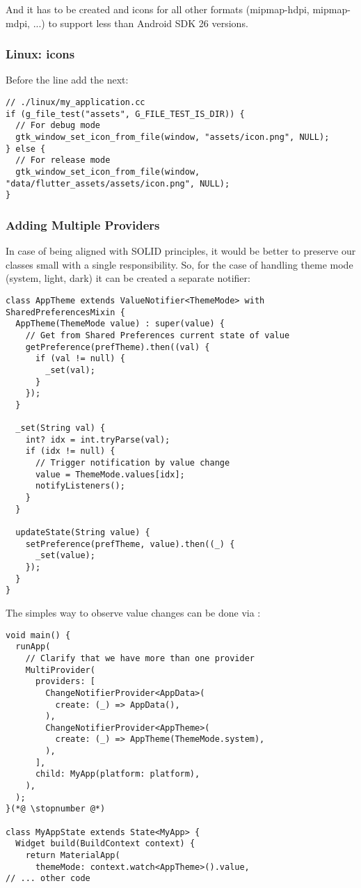 And it has to be created  and  icons for all other formats (mipmap-hdpi, 
mipmap-mdpi, ...) to support less than Android SDK 26 versions.


\subsubsection{Linux: icons}

Before the line  add the next:

\begin{lstlisting}
// ./linux/my_application.cc
if (g_file_test("assets", G_FILE_TEST_IS_DIR)) {
  // For debug mode
  gtk_window_set_icon_from_file(window, "assets/icon.png", NULL); 
} else {
  // For release mode
  gtk_window_set_icon_from_file(window, "data/flutter_assets/assets/icon.png", NULL);
}
\end{lstlisting}


\subsubsection{Adding Multiple Providers}

In case of being aligned with SOLID principles, it would be better to preserve our classes small with a single 
responsibility. So, for the case of handling theme mode (system, light, dark) it can be created a separate notifier:

\begin{lstlisting}
class AppTheme extends ValueNotifier<ThemeMode> with SharedPreferencesMixin {
  AppTheme(ThemeMode value) : super(value) {
    // Get from Shared Preferences current state of value
    getPreference(prefTheme).then((val) {
      if (val != null) {
        _set(val);
      }
    });
  }

  _set(String val) {
    int? idx = int.tryParse(val);
    if (idx != null) {
      // Trigger notification by value change
      value = ThemeMode.values[idx];
      notifyListeners();
    }
  }

  updateState(String value) {
    setPreference(prefTheme, value).then((_) {
      _set(value);
    });
  }
}
\end{lstlisting}

\noindent The simples way to observe value changes can be done via :

\begin{lstlisting}
void main() {
  runApp(
    // Clarify that we have more than one provider
    MultiProvider(
      providers: [
        ChangeNotifierProvider<AppData>(
          create: (_) => AppData(),
        ),
        ChangeNotifierProvider<AppTheme>(
          create: (_) => AppTheme(ThemeMode.system),
        ),
      ],
      child: MyApp(platform: platform),
    ),
  );
}(*@ \stopnumber @*)

class MyAppState extends State<MyApp> {
  Widget build(BuildContext context) {
    return MaterialApp(
      themeMode: context.watch<AppTheme>().value,
// ... other code
\end{lstlisting}

